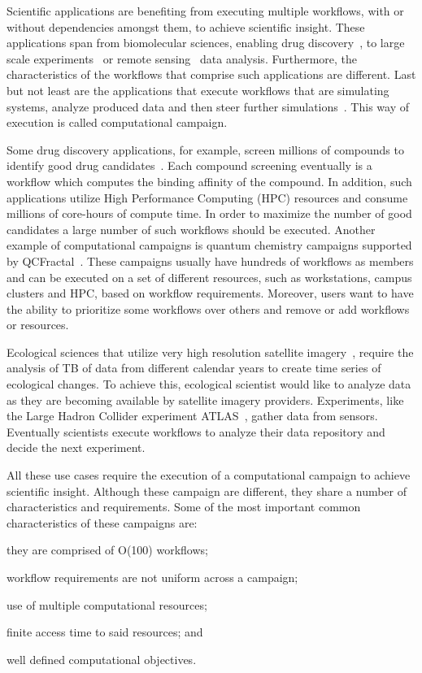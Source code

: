 \label{ch:intro}
Scientific applications are benefiting from executing multiple workflows, with or without dependencies amongst them, to achieve scientific insight.
These applications span from biomolecular sciences, enabling drug discovery~\cite{dakka2018concurrent}, to large scale experiments~\cite{atlas} or remote sensing~\cite{goncalves2020sealnet} data analysis.
Furthermore, the characteristics of the workflows that comprise such applications are different.
Last but not least are the applications that execute workflows that are simulating systems, analyze produced data and then steer further simulations~\cite{dakka2018concurrent}.
This way of execution is called computational campaign.

Some drug discovery applications, for example, screen millions of compounds to identify good drug candidates~\cite{dakka2018concurrent}.
Each compound screening eventually is a workflow which computes the binding affinity of the compound.
In addition, such applications utilize High Performance Computing (HPC) resources and consume millions of core-hours of compute time.
In order to maximize the number of good candidates a large number of such workflows should be executed.
Another example of computational campaigns is quantum chemistry campaigns supported by QCFractal~\cite{qcfractal}.
These campaigns usually have hundreds of workflows as members and can be executed on a set of different resources, such as workstations, campus clusters and HPC, based on workflow requirements.
Moreover, users want to have the ability to prioritize some workflows over others and remove or add workflows or resources.

Ecological sciences that utilize very high resolution satellite imagery~\cite{goncalves2020sealnet}, require the analysis of TB of data from different calendar years to create time series of ecological changes.
To achieve this, ecological scientist would like to analyze data as they are becoming available by satellite imagery providers.
Experiments, like the Large Hadron Collider experiment ATLAS~\cite{atlas}, gather data from sensors.
Eventually scientists execute workflows to analyze their data repository and decide the next experiment.

All these use cases require the execution of a computational campaign to achieve scientific insight.
Although these campaign are different, they share a number of characteristics and requirements.
Some of the most important common characteristics of these campaigns are:
\begin{inparaenum}[(1)]
    \item they are comprised of O(100) workflows;
    \item workflow requirements are not uniform across a campaign;
    \item use of multiple computational resources;
    \item finite access time to said resources; and
    \item well defined computational objectives.
\end{inparaenum}

